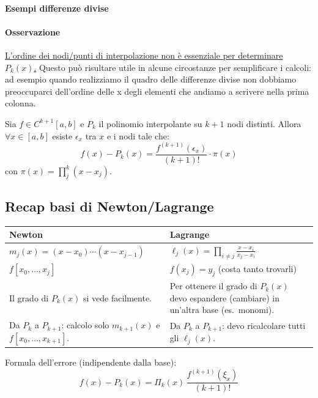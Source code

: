 \documentclass[12pt,a4paper,]{report}
\begin{document}
\paragraph{Esempi differenze divise}

\paragraph{Osservazione}
\uline{L'ordine dei nodi/punti di interpolazione non è essenziale per determinare $P_k(x)$.}
Questo può risultare utile in alcune circostanze per semplificare i calcoli: ad esempio quando realizziamo il quadro delle differenze divise non dobbiamo preoccuparci dell'ordine delle x degli elementi che andiamo a scrivere nella prima colonna.

\begin{teorema}
    \label{th: errore interpolazione polinomiale}
    Sia $f \in C^{k+1}[a,b]$ e $P_k$ il polinomio interpolante su $k+1$ nodi distinti. Allora $\forall x \in [a,b]$ esiste $\epsilon_x$ tra $x$ e i nodi tale che:
    \[
    f(x) - P_k(x) = \frac{f^{(k+1)}(\epsilon_x)}{(k+1)!}\cdot \pi(x)
    \]
    con $\pi(x) = \prod^k_j (x- x_j)$.
\end{teorema}

\subsection{Recap basi di Newton/Lagrange}

\begin{center}
\begin{tabular}{|p{}|p{}|}
\hline
\textbf{Newton} & \textbf{Lagrange} \\ \hline

$m_j(x)=(x-x_0)\cdots(x-x_{j-1})$ &
$\ell_j(x)=\displaystyle\prod_{i\neq j}\frac{x-x_i}{x_j-x_i}$ \\

$f[x_0,\ldots,x_j]$ &
$f(x_j)=y_j$ (costa tanto trovarli) \\ \hline

Il grado di $P_k(x)$ si vede facilmente. &
Per ottenere il grado di $P_k(x)$
devo espandere (cambiare) in un'altra base (es.\ monomi). \\ \hline

Da $P_k$ a $P_{k+1}$:
calcolo solo $m_{k+1}(x)$ e
$f[x_0,\ldots,x_{k+1}]$. &
Da $P_k$ a $P_{k+1}$:
devo ricalcolare tutti gli $\ell_j(x)$. \\ \hline
\end{tabular}
\end{center}
Formula dell'errore (indipendente dalla base):
\[
f(x)-P_k(x)
=
\Pi_k(x)\,
\frac{f^{(k+1)}(\xi_x)}{(k+1)!}
\]
\end{document}
